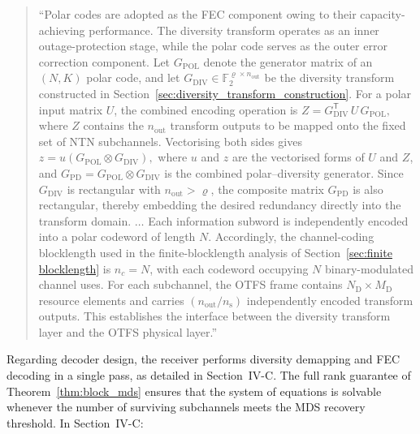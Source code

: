 \begin{quote}
``Polar codes are adopted as the FEC component owing to their capacity-achieving performance. The diversity transform operates as an inner outage-protection stage, while the polar code serves as the outer error correction component. Let $G_{\text{POL}}$ denote the generator matrix of an $(N,K)$ polar code, and let $G_{\text{DIV}} \in \mathbb{F}_2^{\varrho \times n_{\text{out}}}$ be the diversity transform constructed in Section~\ref{sec:diversity_transform_construction}. For a polar input matrix $U$, the combined encoding operation is
$Z = G_{\text{DIV}}^{\mathsf{T}}\, U\, G_{\text{POL}},$
where $Z$ contains the $n_{\text{out}}$ transform outputs to be mapped onto the fixed set of NTN subchannels. Vectorising both sides gives $ z = u\left(G_{\text{POL}} \otimes G_{\text{DIV}}\right),$ where $u$ and $z$ are the vectorised forms of $U$ and $Z$, and $G_{\text{PD}} = G_{\text{POL}} \otimes G_{\text{DIV}}$ is the combined polar--diversity generator. Since $G_{\text{DIV}}$ is rectangular with $n_{\text{out}} > \varrho$, the composite matrix $G_{\text{PD}}$ is also rectangular, thereby embedding the desired redundancy directly into the transform domain. $\ldots$ {\color{blue} Each information subword is independently encoded into a polar codeword of length $N$. Accordingly, the channel-coding blocklength used in the finite-blocklength analysis of Section~\ref{sec:finite blocklength} is $n_c = N$, with each codeword occupying $N$ binary-modulated channel uses. For each subchannel, the OTFS frame contains $N_{\mathrm{D}} \times M_{\mathrm{D}}$ resource elements and carries $(n_{\mathrm{out}}/n_{\mathrm{s}})$ independently encoded transform outputs. This establishes the
interface between the diversity transform layer and the OTFS physical layer.}''
\end{quote}

Regarding decoder design, the receiver performs diversity demapping and FEC decoding in a single pass, as detailed in Section~IV-C. The full rank guarantee of Theorem~\ref{thm:block_mds} ensures that the system of equations is solvable whenever the number of surviving subchannels meets the MDS recovery threshold. In Section~IV-C:


